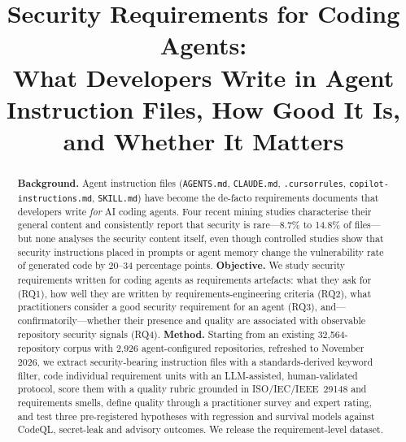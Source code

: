 \documentclass[10pt,conference]{IEEEtran}
\newcommand{\todo}[1]{\textcolor{red}{[TODO: #1]}}
\begin{document}
\title{Security Requirements for Coding Agents:\\What Developers Write in Agent Instruction Files, How Good It Is, and Whether It Matters}

\author{%
\and
\IEEEauthorblockN{\todo{Co-author 2}}
\IEEEauthorblockA{Blekinge Institute of Technology\\Karlskrona, Sweden\\\todo{email}}
\and
\IEEEauthorblockN{\todo{Co-author 3}}
\IEEEauthorblockA{\todo{Affiliation}\\\todo{email}}
}

\maketitle

\begin{abstract}
\textbf{Background.} Agent instruction files (\texttt{AGENTS.md}, \texttt{CLAUDE.md}, \texttt{.cursorrules}, \texttt{copilot-instructions.md}, \texttt{SKILL.md}) have become the de-facto requirements documents that developers write \emph{for} AI coding agents. Four recent mining studies characterise their general content and consistently report that security is rare---8.7\% to 14.8\% of files---but none analyses the security content itself, even though controlled studies show that security instructions placed in prompts or agent memory change the vulnerability rate of generated code by 20--34 percentage points.
\textbf{Objective.} We study security requirements written for coding agents as requirements artefacts: what they ask for (RQ1), how well they are written by requirements-engineering criteria (RQ2), what practitioners consider a good security requirement for an agent (RQ3), and---confirmatorily---whether their presence and quality are associated with observable repository security signals (RQ4).
\textbf{Method.} Starting from an existing 32,564-repository corpus with 2,926 agent-configured repositories, refreshed to November 2026, we extract security-bearing instruction files with a standards-derived keyword filter, code individual requirement units with an LLM-assisted, human-validated protocol, score them with a quality rubric grounded in ISO/IEC/IEEE~29148 and requirements smells, define quality through a practitioner survey and expert rating, and test three pre-registered hypotheses with regression and survival models against CodeQL, secret-leak and advisory outcomes. We release the requirement-level dataset.
\end{abstract}
\end{document}
